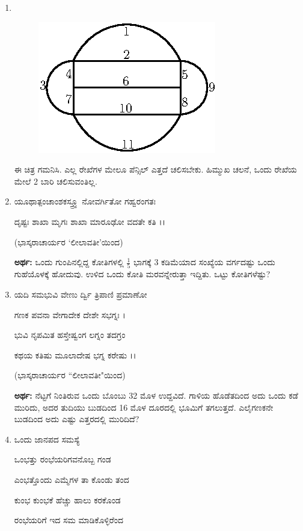 \begin{enumerate}
\item 
~

\begin{figure}[H]
\centering
\includegraphics{images/chap5/q20.eps}
\end{figure}

ಈ ಚಿತ್ರ ಗಮನಿಸಿ. ಎಲ್ಲ ರೇಖೆಗಳ ಮೇಲೂ ಪೆನ್ಸಿಲ್ ಎತ್ತದೆ ಚಲಿಸಬೇಕು. ಹಿಮ್ಮುಖ ಚಲನೆ, ಒಂದು ರೇಖೆಯ ಮೇಲೆ 2 ಬಾರಿ ಚಲಿಸುವಂತಿಲ್ಲ. 

\item ಯೂಥಾತ್ಪಂಚಾಂಶಕಸ್ತ್ರ್ಯೂ ನೋವರ್ಗಿತೋ ಗಹ್ವರಂಗತಃ 

ದೃಷ್ಟಃ ಶಾಖಾ ಮೃಗಃ ಶಾಖಾ ಮಾರೂಢೋ ವದತೇ ಕತಿ ।।

\smallskip
\hfill (ಭಾಸ್ಕರಾಚಾರ್ಯರ `ಲೀಲಾವತೀ'ಯಿಂದ)

{\bf ಅರ್ಥ:} ಒಂದು ಗುಂಪಿನಲ್ಲಿದ್ದ ಕೋತಿಗಳಲ್ಲಿ $\frac{1}{5}$ ಭಾಗಕ್ಕೆ 3 ಕಡಿಮೆಯಾದ ಸಂಖ್ಯೆಯ ವರ್ಗದಷ್ಟು ಒಂದು ಗುಹೆಯೊಳಕ್ಕೆ ಹೋದುವು. ಉಳಿದ ಒಂದು ಕೋತಿ ಮರವನ್ನೇರುತ್ತಾ ಇದ್ದಿತು. ಒಟ್ಟು ಕೋತಿಗಳೆಷ್ಟು? 

\item ಯದಿ ಸಮಭುವಿ ವೇಣು ರ್ದ್ವಿ ತ್ರಿಪಾಣಿ ಪ್ರಮಾಣೋ 

ಗಣಕ ಪವನಾ ವೇಗಾದೇಕ ದೇಶೇ ಸಭಗ್ನಃ ।

ಭುವಿ ನೃಪಮಿತ ಹಸ್ತೇಷ್ವಂಗ ಲಗ್ನಂ ತದಗ್ರಂ 

ಕಥಯ ಕತಿಷು ಮೂಲಾದೇಷ ಭಗ್ನ ಕರೇಷು ।।

\smallskip
\hfill (ಭಾಸ್ಕರಾಚಾರ್ಯರ ``ಲೀಲಾವತೀ"ಯಿಂದ)

{\bf ಅರ್ಥ:} ನೆಟ್ಟಗೆ ನಿಂತಿರುವ ಒಂದು ಬೊಂಬು 32 ಮೊಳ ಉದ್ದವಿದೆ. ಗಾಳಿಯ ಹೊಡೆತದಿಂದ ಅದು ಒಂದು ಕಡೆ ಮುರಿದು, ಅದರ ತುದಿಯು ಬುಡದಿಂದ 16 ಮೊಳ ದೂರದಲ್ಲಿ ಭೂಮಿಗೆ ತಗಲುತ್ತದೆ. ಎಲೈಗಣಕನೇ ಬುಡದಿಂದ ಅದು ಎಷ್ಟು ಎತ್ತರದಲ್ಲಿ ಮುರಿದಿದೆ? 

\item ಒಂದು ಜಾನಪದ ಸಮಸ್ಯೆ 

ಒಂಭತ್ತು ರಂಭೆಯರಿಗವನೊಬ್ಬ ಗಂಡ 

ಎಂಭತ್ತೊಂದು ಎಮ್ಮೆಗಳ ತಾ ಕೊಂಡು ತಂದ 

ಕುಂಭ ಕುಂಭಕೆ ಹೆಚ್ಚು ಹಾಲು ಕರಕೊಂಡ 

ರಂಭೆಯರಿಗೆ ಇದ ಸಮ ಮಾಡಿಕೊಳ್ಳಿರೆಂದ 


\end{enumerate}
